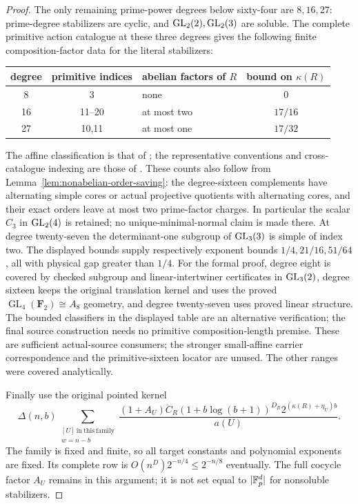 \begin{proof}
The only remaining prime-power degrees below sixty-four are
$8,16,27$: prime-degree stabilizers are cyclic, and
$\operatorname{GL}_2(2),\operatorname{GL}_2(3)$ are soluble. The complete primitive
action catalogue at these three degrees gives the following
finite composition-factor data for the literal stabilizers:
\begin{center}
\begin{tabular}{cclc}
\toprule
degree&primitive indices&abelian factors of $R$&bound on $\kappa(R)$\\
\midrule
8&3&none&0\\
16&11--20&at most two&$17/16$\\
27&10,11&at most one&$17/32$\\\bottomrule
\end{tabular}
\end{center}
The affine classification is that of
\cite{RoneyDougalUnger2003Affine}; the representative conventions and
cross-catalogue indexing are those of
\cite{PrimGrp344,RoneyDougal2005Primitive}. These counts also follow from Lemma~\ref{lem:nonabelian-order-saving}:
the degree-sixteen complements have alternating simple cores or actual
projective quotients with alternating cores, and their exact orders leave
at most two prime-factor charges. In particular the scalar $C_3$ in
$\operatorname{GL}_2(4)$ is retained; no unique-minimal-normal claim is made there.
At degree twenty-seven the determinant-one subgroup of $\operatorname{GL}_3(3)$ is
simple of index two. The displayed bounds supply respectively exponent
bounds $1/4,21/16,51/64$, all with physical gap greater than $1/4$.
For the formal proof, degree eight is covered by checked subgroup and
linear-intertwiner certificates in $\operatorname{GL}_3(2)$, degree sixteen keeps the original translation kernel and uses the proved
$\operatorname{GL}_4(\mathbf F_2)\cong A_8$ geometry, and degree twenty-seven
uses proved linear structure. The bounded classifiers in the displayed table are an alternative verification; the final source construction needs no primitive composition-length premise.
These are sufficient actual-source consumers; the stronger small-affine
carrier correspondence and the primitive-sixteen locator are unused. The other ranges
were covered analytically.

Finally use the original pointed kernel
\[
 \Delta(n,b)\sum_{\substack{[U]\ \mathrm{in\ this\ family}\\w=n-b}}
 \frac{(1+A_U)C_R(1+b\log(b+1))^{D_R}
                  2^{(\kappa(R)+\eta_U)b}}{a(U)}.
\]
The family is fixed and finite, so all target constants and
polynomial exponents are fixed. Its complete row is
$O(n^D)2^{-n/4}\leq2^{-n/8}$ eventually.
The full cocycle factor $A_U$ remains in this argument; it
is not set equal to $|\mathbb F_p^d|$ for nonsoluble stabilizers.
\end{proof}
